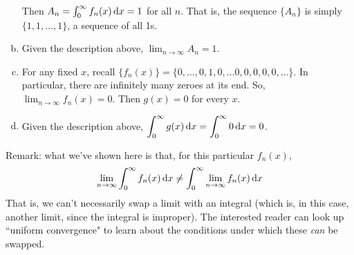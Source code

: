 \begin{solution}
\begin{enumerate}[(a)]
\begin{center}
\end{center}
Then
$A_n = \int_0^\infty f_n(x)\,\mathrm{d}x=1$ for all $n$. That is, the sequence $\{A_n\}$ is simply $\{1,1,\ldots,1\}$, a sequence of all 1s.
\item Given the description above, $\displaystyle\lim_{n \to \infty}A_n=1$.
\item For any fixed $x$, recall $\{f_n(x)\} = \{0,\ldots,0,1,0,\ldots 0,0,0,0,0,\ldots\}$. In particular, there are infinitely many zeroes at its end.
So, $\displaystyle\lim_{n \to \infty}  f_n(x)=0$.
Then  $g(x)=0$ for every $x$.
\item Given the description above, $\displaystyle \int_0^\infty g(x)\,\mathrm{d}x = \int_0^{\infty}0\,\mathrm{d}x=0$.
\end{enumerate}
Remark: what we've shown here is that, for this particular $f_n(x)$,
\[\lim_{n \to \infty}\int_0^{\infty}f_n(x)\,\mathrm{d}x \neq
\int_0^{\infty}\lim_{n \to \infty} f_n(x)\,\mathrm{d}x \]
That is, we can't necessarily swap a limit with an integral (which is, in this case, another limit, since the integral is improper). The interested reader can look up ``uniform convergence" to learn about the conditions under which these \emph{can} be swapped.
\end{solution}



